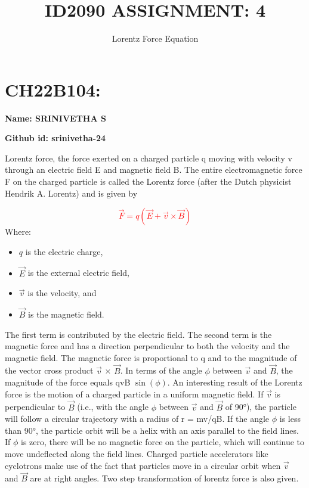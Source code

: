 \documentclass{article}
\title{ID2090 ASSIGNMENT: 4}
\date{}
\author{\Large Lorentz Force Equation}
\begin{document}
\maketitle
\section{CH22B104:}
\begin{flushleft}
\textbf{Name: SRINIVETHA S}

\textbf{Github id: srinivetha-24 }
\end{flushleft}
Lorentz force, the force exerted on a charged particle q moving with velocity v through an electric field E and magnetic field B. The entire electromagnetic force F on the charged particle is called the Lorentz force (after the Dutch physicist Hendrik A. Lorentz) and is given by

\textcolor{red}{\[ \vec{F} = q(\vec{E} + \vec{v} \times \vec{B}) \]}
Where:
\begin{itemize}
    \item \(q\) is the electric charge,
    \item \(\vec{E}\) is the external electric field,
    \item \(\vec{v}\) is the velocity, and
    \item \(\vec{B}\) is the magnetic field.
\end{itemize}
The first term is contributed by the electric field. The second term is the magnetic
force and has a direction perpendicular to both the velocity and the magnetic field. The
magnetic force is proportional to q and to the magnitude of the vector cross product 
\(\vec{v}\) × \(\vec{B}\). In terms of the angle \(\phi\) between  \(\vec{v}\) and
\(\vec{B}\), the magnitude of the force equals qvB \(\sin(\phi)\).
An interesting result of the Lorentz force is the motion of a charged particle in a
uniform magnetic field. If \(\vec{v}\) is perpendicular to \(\vec{B}\) (i.e., with the
angle \(\phi\) between \(\vec{v}\) and \(\vec{B}\) of 90°), the particle will follow a
circular trajectory with a radius of r = mv/qB. If the angle \(\phi\) is less than 90°,
the particle orbit will be a helix with an axis parallel to the field lines. If \(\phi\)
is zero, there will be no magnetic force on the particle, which will continue to move
undeflected along the field lines. Charged particle accelerators like cyclotrons make
use of the fact that particles move in a circular orbit when \(\vec{v}\) and \(\vec{B}\)
are at right angles. Two step transformation of lorentz force is also 
given.\cite{ref=article}\\
\end{document}
